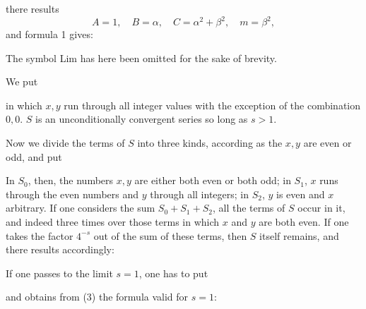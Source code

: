 there results
\[
A = 1, \quad B = \alpha, \quad C = \alpha^2+\beta^2, \quad m = \beta^2,
\]
and formula 1 gives:


The symbol Lim has here been omitted for the sake of brevity.

We put


in which $x, y$ run through all integer values with the exception of the combination $0,0$. $S$ is an unconditionally convergent series so long as $s > 1$.

Now we divide the terms of $S$ into three kinds, according as the $x, y$ are even or odd, and put


In $S_0$, then, the numbers $x, y$ are either both even or both odd; in $S_1$, $x$ runs through the even numbers and $y$ through all integers; in $S_2$, $y$ is even and $x$ arbitrary. If one considers the sum $S_0+S_1+S_2$, all the terms of $S$ occur in it, and indeed three times over those terms in which $x$ and $y$ are both even. If one takes the factor $4^{-s}$ out of the sum of these terms, then $S$ itself remains, and there results accordingly:


If one passes to the limit $s = 1$, one has to put


and obtains from (3) the formula valid for $s = 1$:

